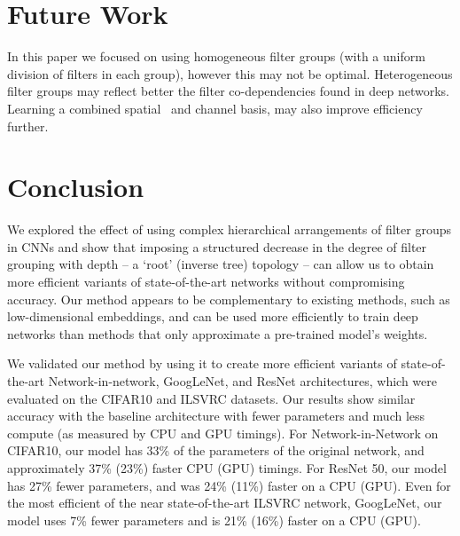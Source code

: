 \documentclass[thesis]{subfiles}
\begin{document}
	\section{Future Work} 
	In this paper we focused on using homogeneous filter groups (with a uniform division of filters in each group), however this may not be optimal. Heterogeneous filter groups may reflect better the filter co-dependencies found in deep networks. Learning a combined spatial~\citep{Ioannou2016} and channel basis, may also improve efficiency further.
	
	\section{Conclusion}
	We explored the effect of using complex hierarchical arrangements of filter groups in CNNs and show that imposing a structured decrease in the degree of filter grouping with depth -- a `root' (inverse tree) topology -- can allow us to obtain more efficient variants of state-of-the-art networks without compromising accuracy. Our method appears to be complementary to existing methods, such as low-dimensional embeddings, and can be used more efficiently to train deep networks than methods that only approximate a pre-trained model's weights.
	
	We validated our method by using it to create more efficient variants of state-of-the-art Network-in-network, GoogLeNet, and ResNet architectures, which were evaluated on the CIFAR10 and ILSVRC datasets. Our results show similar accuracy with the baseline architecture with fewer parameters and much less compute (as measured by CPU and GPU timings). For Network-in-Network on CIFAR10, our model has 33\% of the parameters of the original network, and approximately 37\% (23\%) faster CPU (GPU) timings. For ResNet 50, our model has 27\% fewer parameters, and was 24\% (11\%) faster on a CPU (GPU). 
	Even for the most efficient of the near state-of-the-art ILSVRC network, GoogLeNet, our model uses 7\% fewer parameters and is 21\% (16\%) faster on a CPU (GPU).
	
\end{document}
